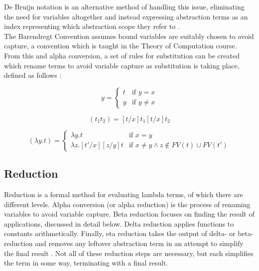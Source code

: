 \documentclass[a4paper,11pt]{report}
\begin{document}
De Bruijn notation is an alternative method of handling this issue, eliminating the need for variables altogether and instead expressing abstraction terms as an index representing which abstraction scope they refer to \cite{Kamareddine2000}.\\

The Barendregt Convention assumes bound variables are suitably chosen to avoid capture, a convention which is taught in the Theory of Computation course. From this and alpha conversion, a set of rules for substitution can be created which rename terms to avoid variable capture as substitution is taking place, defined as follows \cite{Acar2008}:

\begin{equation}
[t/x]y=\begin{cases}
t & \text{if $y=x$}\\
y & \text{if $y\ne x$}
\end{cases}
\end{equation}

\begin{equation}
[t/x](t_1t_2)=[t/x]t_1[t/x]t_2
\end{equation}

\begin{equation}
[t'/x](\lambda y.t)=\begin{cases}
\lambda y.t & \text{if $x=y$}\\
\lambda z.[t'/x][z/y]t & \text{if $x\ne y \land z\notin FV(t) \cup FV(t')$}
\end{cases}
\end{equation}

\subsection{Reduction}

Reduction is a formal method for evaluating lambda terms, of which there are different levels. Alpha conversion (or alpha reduction) \cite{Horowitz2013} is the process of renaming variables to avoid variable capture. Beta reduction focuses on finding the result of applications, discussed in detail below. Delta reduction applies functions to constants arithmetically. Finally, eta reduction takes the output of delta- or beta-reduction and removes any leftover abstraction term in an attempt to simplify the final result \cite{Sookocheff2018Eta}. Not all of these reduction steps are necessary, but each simplifies the term in some way, terminating with a final result.
\end{document}
